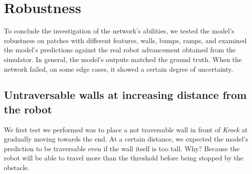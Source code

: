 % 
\section{Robustness}
\label{sec: robustness}
To conclude the investigation of the network's abilities, we tested the model's robustness on patches with different features, walls, bumps, ramps, and examined the model's predictions against the real robot advancement obtained from the simulator. In general, the model's outputs matched the ground truth. When the network failed, on some edge cases, it showed a certain degree of uncertainty.
\subsection{Untraversable walls at increasing distance from the robot}
We first test we performed was to place a not traversable wall in front of \emph{Krock} at gradually moving towards the end. At a certain distance, we expected the model's prediction to be traversable even if the wall itself is too tall. Why? Because the robot will be able to travel more than the threshold before being stopped by the obstacle.

